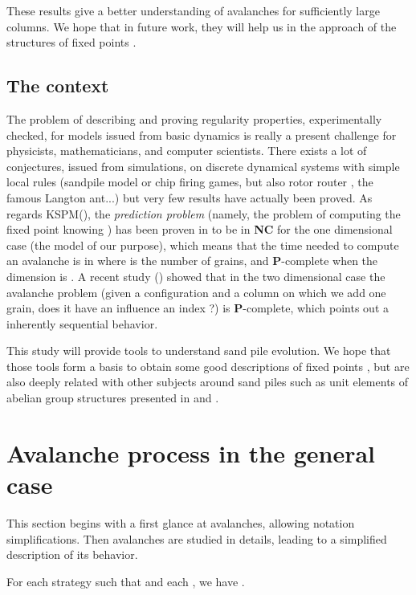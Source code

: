 \documentclass[11pt,a4paper]{llncs}
\begin{document}
These results give a better understanding of avalanches for sufficiently large columns. We hope that in future work, they will help us in the  approach of the structures of fixed points . 

\subsection{The context}

 The problem of describing and proving regularity properties, experimentally checked,  for   models issued from  basic dynamics is really a present challenge for physicists, mathematicians, and computer scientists. There exists
a lot of conjectures, issued from simulations, on  discrete dynamical systems with simple local rules (sandpile model \cite{dartois} or chip firing games, but also  rotor router  \cite{levine},  the famous Langton ant\cite{gajardo}\cite{propp}...)  but very few results have actually been proved. As regards KSPM(), the {\em prediction problem} (namely, the problem of computing the fixed point  knowing ) has been proven in \cite{moore99} to be in \textbf{NC} for the one dimensional case (the model of our purpose), which means that the time needed to compute an avalanche is in  where  is the number of grains, and \textbf{P}-complete when the dimension is .  A recent study (\cite{goles10}) showed that in the two dimensional case the avalanche problem (given a configuration  and a column  on which we add one grain, does it have an influence an index ?) is \textbf{P}-complete, which points out a inherently sequential behavior.

This study will provide tools to understand sand pile evolution. We hope that those tools form a basis to obtain  some good descriptions of fixed points , but are also deeply related with other subjects around sand piles such as unit elements of abelian group structures presented 
in \cite{creutz96} and \cite{dhar90}.

\section{Avalanche process in the general case}\label{section:avalanche}

This section begins with a first glance at avalanches, allowing notation simplifications. Then avalanches are studied in details, leading to a simplified description of its behavior.

\begin{proposition}\label{lemma:01}
  For each strategy   such that   and  each  , we have  . 
\end{proposition}
\end{document}
